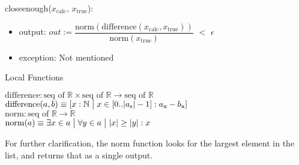 \documentclass[12pt]{article}
\begin{document}
\begin{enumerate}[a)]
\noindent close\textunderscore enough($x_\text{calc}$, $x_\text{true}$):
\begin{itemize}
\item output: $out :=
\dfrac{\text{norm}(\text{difference}(x_\text{calc}, x_\text{true}))}{\text{norm}(x_\text{true})}$ $<$ $\epsilon$

\item exception: Not mentioned
\end{itemize}

Local Functions

$\text{difference}: \text{seq of } \mathbb{R} \times \text{seq of } \mathbb{R} \rightarrow \text{seq of } \mathbb{R}$\\
$\text{difference} (a,b) \equiv [x : \mathbb{N} \bigm| x \in [0..|a_\text{s}| - 1] : a_\text{x} - b_\text{x}]$\\
$\text{norm}: \text{seq of } \mathbb{R}
\rightarrow \mathbb{R}$\\
$\text{norm}(a) \equiv \exists  x \in a \bigm| \forall  y \in a  \bigm| |x| \ge |y| : x$

For further clarification, the norm function looks for the largest element in the list, and returns that as a single output.


\end{enumerate}
\end{document}
